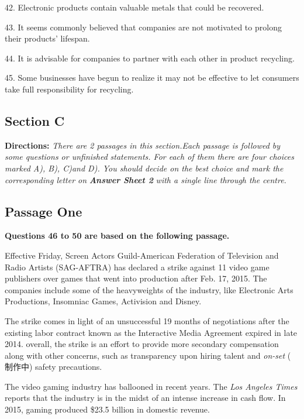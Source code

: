 \documentclass[UTF8,11pt]{ctexart}
\begin{document}
42. Electronic products contain valuable metals that could be recovered.


43. It seems commonly believed that companies are not motivated to prolong their products’ lifespan.


44. It is advisable for companies to partner with each other in product recycling.


45. Some businesses have begun to realize it may not be effective to let consumers take full responsibility for recycling.


\subsection*{\textbf{Section C}}


\textbf{Directions:}\textit{ There are 2 passages in this section.Each passage is followed by some questions or unfinished} \textit{statements. For each of them there are four choices marked A), B), C)and D). You should decide on the best choice} \textit{and mark the corresponding letter on}\textbf{\textit{ Answer Sheet 2}}\textit{ with a single line through the centre.}


\subsection*{\textbf{Passage One}}


\textbf{Questions 46 to 50 are based on the following passage.}


Effective Friday, Screen Actors Guild-American Federation of Television and Radio Artists (SAG-AFTRA) has declared a strike against 11 video game publishers over games that went into production after Feb. 17, 2015. The companies include some of the heavyweights of the industry, like Electronic Arts Productions, Insomniac Games, Activision and Disney.


The strike comes in light of an unsuccessful 19 months of negotiations after the existing labor contract known as the Interactive Media Agreement expired in late 2014. overall, the strike is an effort to provide more secondary compensation along with other concerns, such as transparency upon hiring talent and\textit{ on-set} ( 制作中) safety precautions.


The video gaming industry has ballooned in recent years. The\textit{ Los Angeles Times} reports that the industry is in the midst of an intense increase in cash flow. In 2015, gaming produced \$23.5 billion in domestic revenue.
\end{document}
